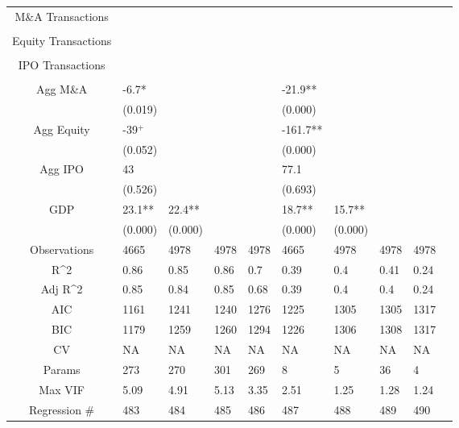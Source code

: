 \documentclass{article}
\begin{document}
\begin{table}[H]
\begin{tabular}{|clllllllll|}
  M\&A Transactions &  &  &  &  &  &  &  &  & \\
   &  &  &  &  &  &  &  &  & \\
  Equity Transactions &  &  &  &  &  &  &  &  & \\
   &  &  &  &  &  &  &  &  & \\
  IPO Transactions &  &  &  &  &  &  &  &  & \\
   &  &  &  &  &  &  &  &  & \\
  Agg M\&A & -6.7* &  &  &  & -21.9** &  &  &  & \\
   & (0.019) &  &  &  & (0.000) &  &  &  & \\
  Agg Equity & -39$^{+}$ &  &  &  & -161.7** &  &  &  & \\
   & (0.052) &  &  &  & (0.000) &  &  &  & \\
  Agg IPO & 43 &  &  &  & 77.1 &  &  &  & \\
   & (0.526) &  &  &  & (0.693) &  &  &  & \\
  GDP & 23.1** & 22.4** &  &  & 18.7** & 15.7** &  &  & \\
   & (0.000) & (0.000) &  &  & (0.000) & (0.000) &  &  & \\
  \hline
 Observations & 4665 & 4978 & 4978 & 4978 & 4665 & 4978 & 4978 & 4978 & \\
  R^2 & 0.86 & 0.85 & 0.86 & 0.7 & 0.39 & 0.4 & 0.41 & 0.24 & \\
  Adj R^2 & 0.85 & 0.84 & 0.85 & 0.68 & 0.39 & 0.4 & 0.4 & 0.24 & \\
  AIC & 1161 & 1241 & 1240 & 1276 & 1225 & 1305 & 1305 & 1317 & \\
  BIC & 1179 & 1259 & 1260 & 1294 & 1226 & 1306 & 1308 & 1317 & \\
  CV & NA & NA & NA & NA & NA & NA & NA & NA & \\
  Params & 273 & 270 & 301 & 269 & 8 & 5 & 36 & 4 & \\
  Max VIF & 5.09 & 4.91 & 5.13 & 3.35 & 2.51 & 1.25 & 1.28 & 1.24 & \\
  Regression \# & 483 & 484 & 485 & 486 & 487 & 488 & 489 & 490 & \\
   \hline
\end{tabular}

\end{table}
\end{document}
